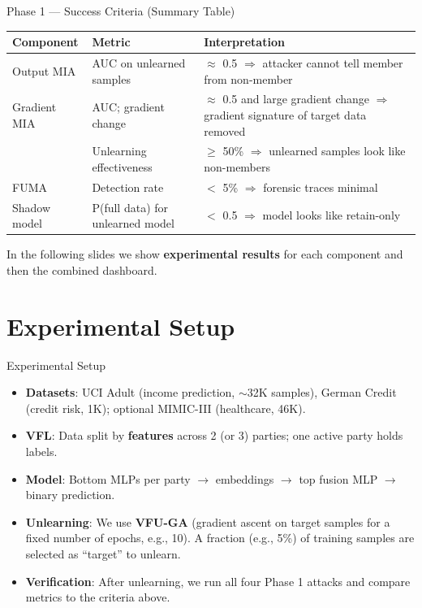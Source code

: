 \documentclass[11pt,aspectratio=169]{beamer}
\begin{document}
\begin{frame}{Phase 1 — Success Criteria (Summary Table)}
  \begin{center}
    \small
    \begin{tabular}{@{}p{3.2cm}p{3.2cm}p{3.8cm}@{}}
      \toprule
      \textbf{Component} & \textbf{Metric} & \textbf{Interpretation} \\
      \midrule
      Output MIA & AUC on unlearned samples & $\approx$ 0.5 $\Rightarrow$ attacker cannot tell member from non-member \\
      Gradient MIA & AUC; gradient change & $\approx$ 0.5 and large gradient change $\Rightarrow$ gradient signature of target data removed \\
      & Unlearning effectiveness & $\geq$ 50\% $\Rightarrow$ unlearned samples look like non-members \\
      FUMA & Detection rate & $<$ 5\% $\Rightarrow$ forensic traces minimal \\
      Shadow model & P(full data) for unlearned model & $<$ 0.5 $\Rightarrow$ model looks like retain-only \\
      \bottomrule
    \end{tabular}
  \end{center}
  \vspace{0.5em}
  In the following slides we show \textbf{experimental results} for each component and then the combined dashboard.
\end{frame}

\section{Experimental Setup}

\begin{frame}{Experimental Setup}
  \begin{itemize}
    \item \textbf{Datasets}: UCI Adult (income prediction, $\sim$32K samples), German Credit (credit risk, 1K); optional MIMIC-III (healthcare, 46K).
    \item \textbf{VFL}: Data split by \textbf{features} across 2 (or 3) parties; one active party holds labels.
    \item \textbf{Model}: Bottom MLPs per party $\to$ embeddings $\to$ top fusion MLP $\to$ binary prediction.
    \item \textbf{Unlearning}: We use \textbf{VFU-GA} (gradient ascent on target samples for a fixed number of epochs, e.g., 10). A fraction (e.g., 5\%) of training samples are selected as ``target'' to unlearn.
    \item \textbf{Verification}: After unlearning, we run all four Phase 1 attacks and compare metrics to the criteria above.
  \end{itemize}
\end{frame}
\end{document}

